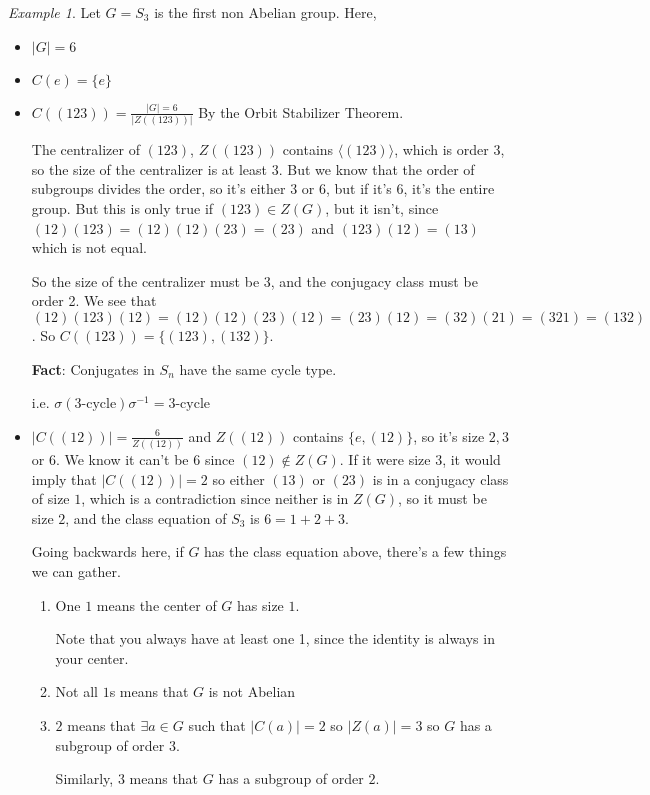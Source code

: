 \documentclass[12pt]{article}
\newcommand{\lr}[1]{\langle #1 \rangle}
\theoremstyle{remark}
\theoremstyle{remark}
\theoremstyle{remark}
\newtheorem{example}{Example}
\theoremstyle{remark}
\theoremstyle{remark}
\begin{document}
\begin{example}
  Let $G = S_3$ is the first non Abelian group. Here,

  \begin{itemize}
    \item $|G| = 6$
    \item $C(e) = \{e\}$
    \item $C((123)) = \frac{|G| = 6}{|Z((123))|}$ By the Orbit Stabilizer
      Theorem.

      The centralizer of $(123)$, $Z((123))$ contains $\lr {(123)}$, which is
      order $3$, so the size of the centralizer is at least $3$. But we know
      that the order of subgroups divides the order, so it's either $3$ or $6$,
      but if it's $6$, it's the entire group. But this is only true if $(123)
      \in Z(G)$, but it isn't, since $(12)(123) = (12)(12)(23) = (23)$ and
      $(123)(12) = (13)$ which is not equal.

      So the size of the centralizer must be 3, and the conjugacy class must be
      order 2. We see that $(12)(123)(12) = (12)(12)(23)(12) = (23)(12) =
      (32)(21) = (321) = (132)$. So $C((123)) = \{(123), (132)\}$.

      {\bf Fact}: Conjugates in $S_n$ have the same cycle type.

      i.e. $\sigma(\text{3-cycle})\sigma^{-1} = \text{3-cycle}$

    \item $|C((12))| = \frac{6}{Z((12))}$ and $Z((12))$ contains $\{e, (12)\}$,
      so it's size $2, 3$ or $6$. We know it can't be $6$ since $(12) \not\in
      Z(G)$. If it were size $3$, it would imply that $|C((12))| = 2$ so either
      $(13)$ or $(23)$ is in a conjugacy class of size $1$, which is a
      contradiction since neither is in $Z(G)$, so it must be size $2$, and the
      class equation of $S_3$ is $6 = 1 + 2 + 3$.

      Going backwards here, if $G$ has the class equation above, there's a few
      things we can gather.

      \begin{enumerate}
        \item One $1$ means the center of $G$ has size $1$.

          Note that you always have at least one 1, since the identity is always
          in your center.

        \item Not all $1$s means that $G$ is not Abelian
        \item $2$ means that $\exists a \in G$ such that $|C(a)| = 2$ so $|Z(a)|
          = 3$ so $G$ has a subgroup of order $3$.

          Similarly, $3$ means that $G$ has a subgroup of order $2$.
      \end{enumerate}
  \end{itemize}
\end{example}
\end{document}
